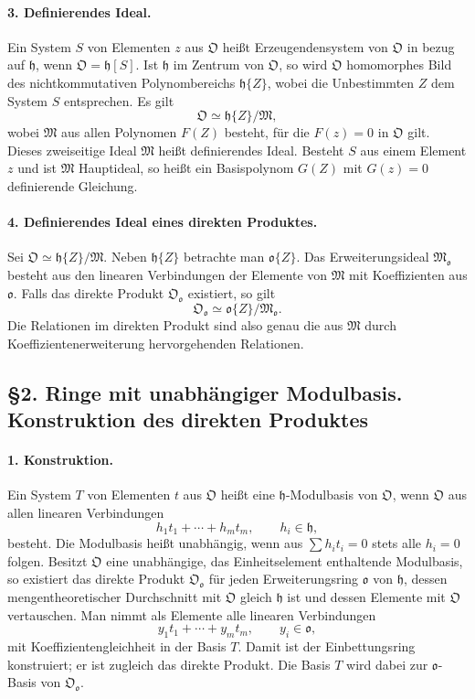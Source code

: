 \documentclass[11pt]{article}
\begin{document}
\paragraph{3. Definierendes Ideal.}
Ein System $S$ von Elementen $z$ aus $\mathfrak O$ heißt Erzeugendensystem von $\mathfrak O$ in bezug auf $\mathfrak h$, wenn $\mathfrak O=\mathfrak h[S]$. Ist $\mathfrak h$ im Zentrum von $\mathfrak O$, so wird $\mathfrak O$ homomorphes Bild des nichtkommutativen Polynombereichs $\mathfrak h\{Z\}$, wobei die Unbestimmten $Z$ dem System $S$ entsprechen. Es gilt
\[
        \mathfrak O\simeq \mathfrak h\{Z\}/\mathfrak M,
\]
wobei $\mathfrak M$ aus allen Polynomen $F(Z)$ besteht, für die $F(z)=0$ in $\mathfrak O$ gilt. Dieses zweiseitige Ideal $\mathfrak M$ heißt definierendes Ideal. Besteht $S$ aus einem Element $z$ und ist $\mathfrak M$ Hauptideal, so heißt ein Basispolynom $G(Z)$ mit $G(z)=0$ definierende Gleichung.

\paragraph{4. Definierendes Ideal eines direkten Produktes.}
Sei $\mathfrak O\simeq\mathfrak h\{Z\}/\mathfrak M$. Neben $\mathfrak h\{Z\}$ betrachte man $\mathfrak o\{Z\}$. Das Erweiterungsideal $\mathfrak M_{\mathfrak o}$ besteht aus den linearen Verbindungen der Elemente von $\mathfrak M$ mit Koeffizienten aus $\mathfrak o$. Falls das direkte Produkt $\mathfrak O_{\mathfrak o}$ existiert, so gilt
\[
        \mathfrak O_{\mathfrak o}\simeq \mathfrak o\{Z\}/\mathfrak M_{\mathfrak o}.
\]
Die Relationen im direkten Produkt sind also genau die aus $\mathfrak M$ durch Koeffizientenerweiterung hervorgehenden Relationen.

\subsection*{§2. Ringe mit unabhängiger Modulbasis. Konstruktion des direkten Produktes}

\paragraph{1. Konstruktion.}
Ein System $T$ von Elementen $t$ aus $\mathfrak O$ heißt eine $\mathfrak h$-Modulbasis von $\mathfrak O$, wenn $\mathfrak O$ aus allen linearen Verbindungen
\[
        h_1t_1+\cdots+h_mt_m,
        \qquad h_i\in\mathfrak h,
\]
besteht. Die Modulbasis heißt unabhängig, wenn aus $\sum h_it_i=0$ stets alle $h_i=0$ folgen. Besitzt $\mathfrak O$ eine unabhängige, das Einheitselement enthaltende Modulbasis, so existiert das direkte Produkt $\mathfrak O_{\mathfrak o}$ für jeden Erweiterungsring $\mathfrak o$ von $\mathfrak h$, dessen mengentheoretischer Durchschnitt mit $\mathfrak O$ gleich $\mathfrak h$ ist und dessen Elemente mit $\mathfrak O$ vertauschen. Man nimmt als Elemente alle linearen Verbindungen
\[
        y_1t_1+\cdots+y_mt_m,
        \qquad y_i\in\mathfrak o,
\]
mit Koeffizientengleichheit in der Basis $T$. Damit ist der Einbettungsring konstruiert; er ist zugleich das direkte Produkt. Die Basis $T$ wird dabei zur $\mathfrak o$-Basis von $\mathfrak O_{\mathfrak o}$.
\end{document}
